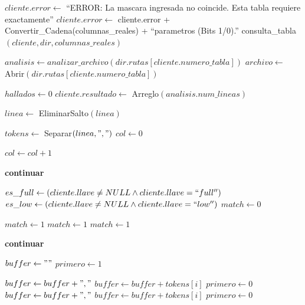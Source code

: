 \begin{tcolorbox}[colback=white, colframe=azul_unam, 
title=Pseudocódigo: consulta.c, breakable]
\begin{algorithmic}[1]
    \State $cliente.error \gets$ ``ERROR: La mascara ingresada no coincide. Esta tabla requiere exactamente'' 
    \State $cliente.error \gets$ cliente.error + Convertir\_Cadena(columnas\_reales) + ``parametros (Bits 1/0).''
\Else
    \State consulta\_tabla$(cliente, dir, columnas\_reales)$
\EndIf

\EndProcedure

\vspace{0.3cm}



\State $analisis \gets analizar\_archivo(dir.rutas[cliente.numero\_tabla])$
\State $archivo \gets$ Abrir$(dir.rutas[cliente.numero\_tabla])$

\State $hallados \gets 0$
\State $cliente.resultado \gets$ Arreglo$(analisis.num\_lineas)$


    \State $linea \gets$ EliminarSalto$(linea)$

    \State $tokens \gets$ Separar$(linea, ",")$
    \State $col \gets 0$

        \State $col \gets col + 1$
    \EndFor

        \State \textbf{continuar}
    \EndIf

    \State $es\_full \gets (cliente.llave \neq NULL \land cliente.llave = ``full'')$
    \State $es\_low \gets (cliente.llave \neq NULL \land cliente.llave = ``low'')$
    \State $match \gets 0$

        \State $match \gets 1$
        \State $match \gets 1$
        \State $match \gets 1$
    \EndIf

        \State \textbf{continuar}
    \EndIf

    \State $buffer \gets ""$
    \State $primero \gets 1$

                \State $buffer \gets buffer + ","$
            \EndIf
            \State $buffer \gets buffer + tokens[i]$
            \State $primero \gets 0$
        \EndFor
    \Else
                        \State $buffer \gets buffer + ","$
                    \EndIf
                    \State $buffer \gets buffer + tokens[i]$
                    \State $primero \gets 0$
                \EndIf
            \EndIf
        \EndFor
    \EndIf


\end{algorithmic}
\end{tcolorbox}
